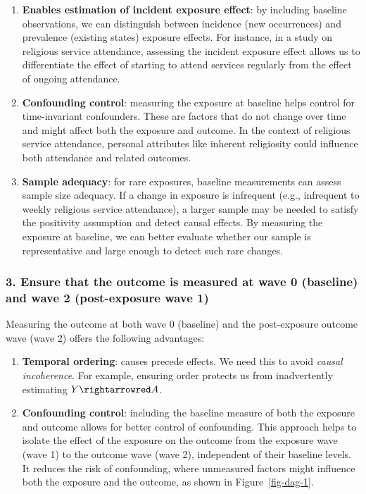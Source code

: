 \documentclass[
  singlecolumn]{article}
\begin{document}
\begin{enumerate}
\def\labelenumi{\arabic{enumi}.}
\item
  \textbf{Enables estimation of incident exposure effect}: by including
  baseline observations, we can distinguish between incidence (new
  occurrences) and prevalence (existing states) exposure effects. For
  instance, in a study on religious service attendance, assessing the
  incident exposure effect allows us to differentiate the effect of
  starting to attend services regularly from the effect of ongoing
  attendance.
\item
  \textbf{Confounding control}: measuring the exposure at baseline helps
  control for time-invariant confounders. These are factors that do not
  change over time and might affect both the exposure and outcome. In
  the context of religious service attendance, personal attributes like
  inherent religiosity could influence both attendance and related
  outcomes.
\item
  \textbf{Sample adequacy}: for rare exposures, baseline measurements
  can assess sample size adequacy. If a change in exposure is infrequent
  (e.g., infrequent to weekly religious service attendance), a larger
  sample may be needed to satisfy the positivity assumption and detect
  causal effects. By measuring the exposure at baseline, we can better
  evaluate whether our sample is representative and large enough to
  detect such rare changes.
\end{enumerate}

\subsubsection{3. Ensure that the outcome is measured at wave 0
(baseline) and wave 2 (post-exposure wave
1)}\label{ensure-that-the-outcome-is-measured-at-wave-0-baseline-and-wave-2-post-exposure-wave-1}

Measuring the outcome at both wave 0 (baseline) and the post-exposure
outcome wave (wave 2) offers the following advantages:

\begin{enumerate}
\def\labelenumi{\arabic{enumi}.}
\item
  \textbf{Temporal ordering}: causes precede effects. We need this to
  avoid \emph{causal incoherence}. For example, ensuring order protects
  us from inadvertently estimating \(Y\rightarrowred A\).
\item
  \textbf{Confounding control}: including the baseline measure of both
  the exposure and outcome allows for better control of confounding.
  This approach helps to isolate the effect of the exposure on the
  outcome from the exposure wave (wave 1) to the outcome wave (wave 2),
  independent of their baseline levels. It reduces the risk of
  confounding, where unmeasured factors might influence both the
  exposure and the outcome, as shown in Figure~\ref{fig-dag-1}.
\end{enumerate}
\end{document}

